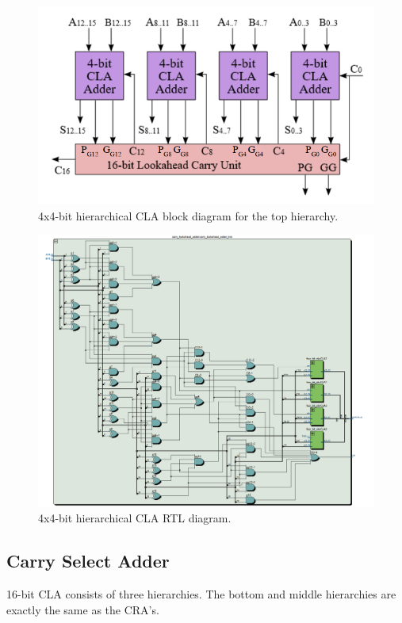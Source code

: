 \documentclass[12pt]{article}
\begin{document}
\begin{figure}[H]
    \centering
    \includegraphics[width=12cm]{4x4_CLA.png}
    \caption{4x4-bit hierarchical CLA block diagram for the top hierarchy. \cite{GG4.6}}
\end{figure}

\begin{figure}[H]
    \centering
    \includegraphics[width=15cm]{CLA_top.png}
    \caption{4x4-bit hierarchical CLA RTL diagram.}
\end{figure}

\subsection{Carry Select Adder}
16-bit CLA consists of three hierarchies. The bottom and middle hierarchies are exactly the same as the CRA's. \\
\end{document}
